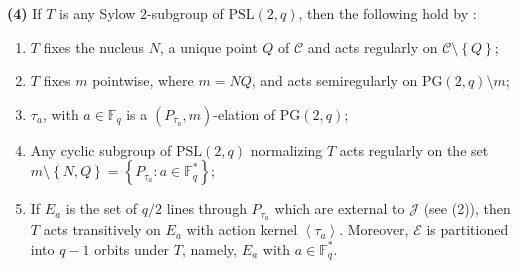 \documentclass[a4paper,twopage,reqno,12pt]{amsart}
\theoremstyle{definition}
\numberwithin{equation}{section}
\newcommand{\PSL}{\mathrm{PSL}}
\newcommand{\PG}{\mathrm{PG}}
\begin{document}
\noindent \textbf{(4)} If $T$ is any Sylow $2$-subgroup of $\PSL(2,q)$, then the following hold by \cite[Lemma 2.3]{MZZZ}:
\begin{enumerate}
    \item[(i)] $T$ fixes the nucleus $N$, a unique point $Q$ of $\mathcal{C}$ and acts regularly on $\mathcal{C}\setminus \left\{ Q\right\}$;
    \item[(ii)] $T$ fixes $m$ pointwise, where $m=NQ$, and acts semiregularly on $\PG(2,q)\setminus m$;
    \item[(iii)]  $\tau_{a}$, with $a \in \mathbb{F}_{q}$ is a $(P_{\tau_{a}},m)$-elation of $\PG(2,q)$;
    \item[(iv)]  Any cyclic subgroup of $\PSL(2,q)$ normalizing $T$ acts regularly on the set $m\setminus \left\{ N,Q\right\}=\left\{ P_{\tau _{a}}:a \in \mathbb{F}^{\ast}_{q}\right\}$;
    \item[(v)] If $E_{a}$ is the set of $q/2$ lines through $P_{\tau_{a}}$ which are external to $\mathcal{J}$ (see (2)), then $T$ acts transitively on $E_{a}$ with action kernel $\left\langle \tau _{a} \right\rangle$. Moreover, $\mathcal{E}$ is partitioned into $q-1$ orbits under $T$, namely, $E_{a}$ with $a\in \mathbb{F}^{\ast}_{q}$.
\end{enumerate}
\end{document}
